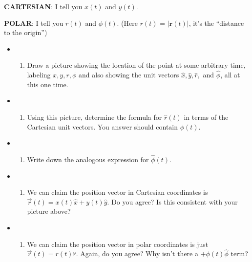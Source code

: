 \textbf{CARTESIAN}: I tell you \(x(t)\) and \(y(t)\).

\textbf{POLAR}: I tell you \(r(t)\) and \(\phi(t)\). (Here \(r(t)\) =
\(|\mathbf{r}(t)|\), it's the ``distance to the origin'')

\begin{itemize}
\tightlist
\item
  \begin{enumerate}
  \def\labelenumi{(\alph{enumi})}
  \tightlist
  \item
    Draw a picture showing the location of the point at some arbitrary
    time, labeling \(x, y, r, \phi\) and also showing the unit vectors
    \(\hat{x}, \hat{y}, \hat{r},\) and \(\hat{\phi}\), all at this one
    time.
  \end{enumerate}
\item
  \begin{enumerate}
  \def\labelenumi{(\alph{enumi})}
  \setcounter{enumi}{1}
  \tightlist
  \item
    Using this picture, determine the formula for \(\hat{r}(t)\) in
    terms of the Cartesian unit vectors. You answer should contain
    \(\phi(t)\).
  \end{enumerate}
\item
  \begin{enumerate}
  \def\labelenumi{(\alph{enumi})}
  \setcounter{enumi}{2}
  \tightlist
  \item
    Write down the analogous expression for \(\hat{\phi}(t)\).
  \end{enumerate}
\item
  \begin{enumerate}
  \def\labelenumi{(\alph{enumi})}
  \setcounter{enumi}{3}
  \tightlist
  \item
    We can claim the position vector in Cartesian coordinates is
    \(\vec{r}(t) = x(t)\hat{x} + y(t)\hat{y}\). Do you agree? Is this
    consistent with your picture above?
  \end{enumerate}
\item
  \begin{enumerate}
  \def\labelenumi{(\alph{enumi})}
  \setcounter{enumi}{4}
  \tightlist
  \item
    We can claim the position vector in polar coordinates is just
    \(\vec{r}(t) = r(t)\hat{r}\). Again, do you agree? Why isn't there a
    \(+\phi(t)\hat{\phi}\) term?
  \end{enumerate}
\end{itemize}

